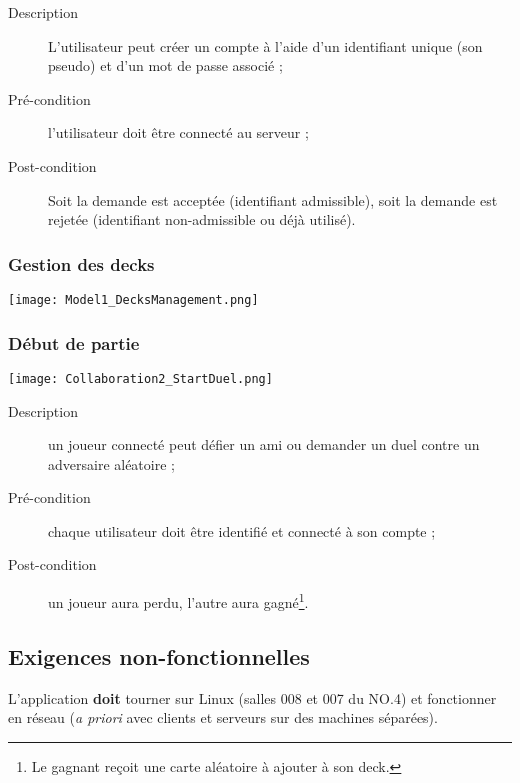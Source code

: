 \documentclass{article}
\begin{document}
            \begin{description}
                \item[Description] L'utilisateur peut créer un compte à l'aide d'un identifiant unique (son pseudo) et d'un mot de passe associé ;
                \item[Pré-condition] l'utilisateur doit être connecté au serveur ;
                \item[Post-condition] Soit la demande est acceptée (identifiant admissible), soit la demande est rejetée (identifiant non-admissible ou déjà utilisé).
            \end{description}

        \subsubsection{Gestion des \glspl{deck}}
            \begin{center}\texttt{[image: Model1\_DecksManagement.png]}\end{center}

        \subsubsection{Début de partie}
            \begin{center}\texttt{[image: Collaboration2\_StartDuel.png]}\end{center}

            \begin{description}
                \item[Description] un joueur connecté peut défier un ami ou demander un duel contre un adversaire aléatoire ;
                \item[Pré-condition] chaque utilisateur doit être identifié et connecté à son compte ;
                \item[Post-condition] un joueur aura perdu, l'autre aura gagné\footnote{Le gagnant reçoit une carte aléatoire à ajouter à son \gls{deck}.}.
            \end{description}

    \subsection{Exigences non-fonctionnelles}
        L'application \textbf{doit} tourner sur Linux (salles 008 et 007 du NO.4) et fonctionner en réseau (\textit{a priori} avec clients
        et serveurs sur des machines séparées).
\end{document}
